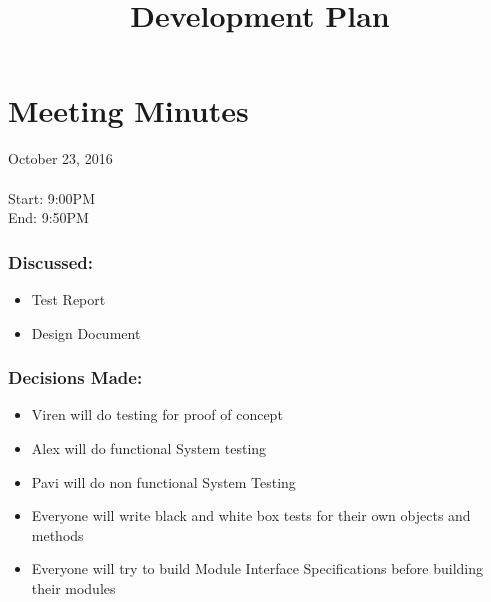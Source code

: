 \documentclass{article}
\begin{document}
\newpage
\title{Development Plan}

\section*  {Meeting Minutes}

October 23, 2016\\
\\
Start: 9:00PM \\
End: 9:50PM


\subsubsection* {Discussed:}
\begin{itemize}
\item Test Report
\item Design Document
\end{itemize}

\subsubsection* {Decisions Made:}
\begin{itemize}
\item Viren will do testing for proof of concept
\item Alex will do functional System testing
\item Pavi will do non functional System Testing
\item Everyone will write black and white box tests for their own objects and methods
\item Everyone will try to build Module Interface Specifications before building their modules
\end{itemize}
\end{document}
